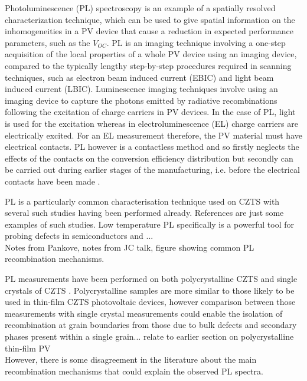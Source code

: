 Photoluminescence (PL) spectroscopy is an example of a spatially resolved characterization technique, which can be used to give spatial information on the inhomogeneities in a PV device that cause a reduction in expected performance parameters, such as the $V_{OC}$.
PL is an imaging technique involving a one-step acquisition of the local properties of a whole PV device using an imaging device, compared to the typically lengthy step-by-step procedures required in scanning techniques, such as electron beam induced current (EBIC) and light beam induced current (LBIC). Luminescence imaging techniques involve using an imaging device to capture the photons emitted by radiative recombinations following the excitation of charge carriers in PV devices. In the case of PL, light is used for the excitation whereas in electroluminescence (EL) charge carriers are electrically excited. For an EL measurement therefore, the PV material must have electrical contacts. PL however is a contactless method and so firstly neglects the effects of the contacts on the conversion efficiency distribution but secondly can be carried out during earlier stages of the manufacturing, i.e. before the electrical contacts have been made \cite{spatial_resolved_book}.



PL is a particularly common characterisation technique used on CZTS with several such studies having been performed already. References  are just some examples of such studies. Low temperature PL specifically is a powerful tool for probing defects in semiconductors \cite{Gershon1} and ...\\
Notes from Pankove, notes from JC talk, figure showing common PL recombination mechanisms.

PL measurements have been performed on both polycrystalline CZTS \cite{Romero, Miyamoto, Unold} and single crystals of CZTS \cite{Halliday, Levcenko, Hones}. Polycrystalline samples are more similar to those likely to be used in thin-film CZTS photovoltaic devices, however comparison between those measurements with single crystal measurements could enable the isolation of recombination at grain boundaries from those due to bulk defects and secondary phases present within a single grain... relate to earlier section on polycrystalline thin-film PV\\

However, there is some disagreement in the literature about the main recombination mechanisms that could explain the observed PL spectra.

